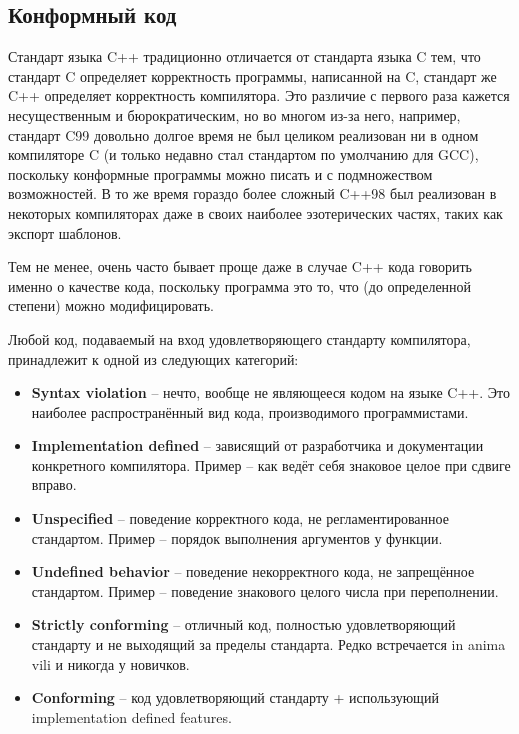 \documentclass[a4paper,12pt,oneside]{book}
\begin{document}
\subsection{Конформный код}\label{ConformingCode}

Стандарт языка C++ традиционно отличается от стандарта языка C тем, что стандарт C определяет корректность программы, написанной на C, стандарт же C++ определяет корректность компилятора. Это различие с первого раза кажется несущественным и бюрократическим, но во многом из-за него, например, стандарт C99 довольно долгое время не был целиком реализован ни в одном компиляторе C (и только недавно стал стандартом по умолчанию для GCC), поскольку конформные программы можно писать и с подмножеством возможностей. В то же время гораздо более сложный C++98 был реализован в некоторых компиляторах даже в своих наиболее эзотерических частях, таких как экспорт шаблонов.

Тем не менее, очень часто бывает проще даже в случае C++ кода говорить именно о качестве кода, поскольку программа это то, что (до определенной степени) можно модифицировать.

Любой код, подаваемый на вход удовлетворяющего стандарту компилятора, принадлежит к одной из следующих категорий:

\begin{itemize}
\item \textbf{Syntax violation} -- нечто, вообще не являющееся кодом на языке C++. Это наиболее распространённый вид кода, производимого программистами.

\item \textbf{Implementation defined} -- зависящий от разработчика и документации конкретного компилятора. Пример -- как ведёт себя знаковое целое при сдвиге вправо.

\item \textbf{Unspecified} -- поведение корректного кода, не регламентированное стандартом. Пример -- порядок выполнения аргументов у функции.

\item \textbf{Undefined behavior} -- поведение некорректного кода, не запрещённое стандартом. Пример – поведение знакового целого числа при переполнении.

\item \textbf{Strictly conforming} -- отличный код, полностью удовлетворяющий стандарту и не выходящий за пределы стандарта. Редко встречается in anima vili и никогда у новичков.

\item \textbf{Conforming} -- код удовлетворяющий стандарту + использующий implementation defined features.
\end{itemize}
\end{document}
